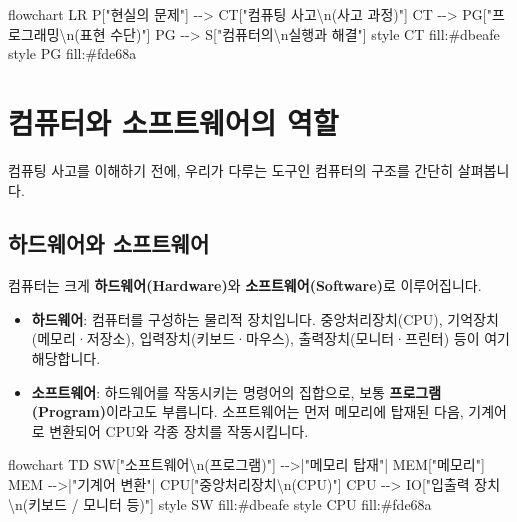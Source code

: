 \documentclass[
  korean,
  11pt,
  a4paper,
  DIV=11,
  numbers=noendperiod]{scrreprt}
\newenvironment{Shaded}{\begin{snugshade}}{\end{snugshade}}
\newcommand{\NormalTok}[1]{\textcolor[rgb]{0.00,0.23,0.31}{#1}}
\providecommand{\tightlist}{%
  \setlength{\itemsep}{0pt}\setlength{\parskip}{0pt}}
\begin{document}
\begin{Shaded}
\begin{Highlighting}[]
\NormalTok{flowchart LR}
\NormalTok{    P["현실의 문제"] {-}{-}\textgreater{} CT["컴퓨팅 사고\textbackslash{}n(사고 과정)"]}
\NormalTok{    CT {-}{-}\textgreater{} PG["프로그래밍\textbackslash{}n(표현 수단)"]}
\NormalTok{    PG {-}{-}\textgreater{} S["컴퓨터의\textbackslash{}n실행과 해결"]}
\NormalTok{    style CT fill:\#dbeafe}
\NormalTok{    style PG fill:\#fde68a}
\end{Highlighting}
\end{Shaded}

\section{컴퓨터와 소프트웨어의 역할}\label{sec-hw-sw}

컴퓨팅 사고를 이해하기 전에, 우리가 다루는 도구인 컴퓨터의 구조를 간단히
살펴봅니다.

\subsection{하드웨어와
소프트웨어}\label{uxd558uxb4dcuxc6e8uxc5b4uxc640-uxc18cuxd504uxd2b8uxc6e8uxc5b4}

컴퓨터는 크게 \textbf{하드웨어(Hardware)}와
\textbf{소프트웨어(Software)}로 이루어집니다.

\begin{itemize}
\tightlist
\item
  \textbf{하드웨어}: 컴퓨터를 구성하는 물리적 장치입니다.
  중앙처리장치(CPU), 기억장치(메모리·저장소), 입력장치(키보드·마우스),
  출력장치(모니터·프린터) 등이 여기 해당합니다.
\item
  \textbf{소프트웨어}: 하드웨어를 작동시키는 명령어의 집합으로, 보통
  \textbf{프로그램(Program)}이라고도 부릅니다. 소프트웨어는 먼저
  메모리에 탑재된 다음, 기계어로 변환되어 CPU와 각종 장치를
  작동시킵니다.
\end{itemize}

\begin{Shaded}
\begin{Highlighting}[]
\NormalTok{flowchart TD}
\NormalTok{    SW["소프트웨어\textbackslash{}n(프로그램)"] {-}{-}\textgreater{}|"메모리 탑재"| MEM["메모리"]}
\NormalTok{    MEM {-}{-}\textgreater{}|"기계어 변환"| CPU["중앙처리장치\textbackslash{}n(CPU)"]}
\NormalTok{    CPU {-}{-}\textgreater{} IO["입출력 장치\textbackslash{}n(키보드 / 모니터 등)"]}
\NormalTok{    style SW fill:\#dbeafe}
\NormalTok{    style CPU fill:\#fde68a}
\end{Highlighting}
\end{Shaded}
\end{document}
